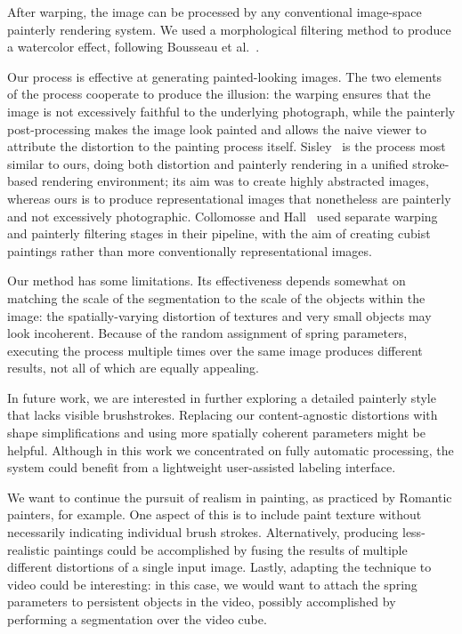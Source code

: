 After warping, the image can be processed by any conventional image-space
painterly rendering system. We used a morphological filtering method to
produce a watercolor effect, following Bousseau et al.~\cite{Bousseau:2007}.

Our process is effective at generating painted-looking images. The two elements
of the process cooperate to produce the illusion: the warping ensures that the
image is not excessively faithful to the underlying photograph, while the
painterly post-processing makes the image look painted and allows the naive
viewer to attribute the distortion to the painting process itself.
Sisley~\cite{sisley}
 is the process most similar to ours, doing both distortion
and painterly rendering in a unified stroke-based rendering environment; its aim
was to create highly abstracted images, whereas ours is to produce
representational images that nonetheless are painterly and not excessively
photographic. Collomosse and Hall~\cite{cubism} 
used separate warping and painterly filtering
stages in their pipeline, with the aim of creating cubist paintings rather than
more conventionally representational images.

Our method has some limitations. Its effectiveness depends somewhat on matching
the scale of the segmentation to the scale of the objects within the image: the
spatially-varying distortion of textures and very small objects may look
incoherent. Because of the random assignment of spring parameters, executing the
process multiple times over the same image produces different results, not all
of which are equally appealing.

In future work, we are interested in further exploring a detailed painterly
style that lacks visible brushstrokes. Replacing our content-agnostic
distortions with shape simplifications and using more spatially coherent
parameters might be helpful. Although in this work we concentrated on fully
automatic processing, the system could benefit from a lightweight user-assisted
labeling interface.

We want to continue the pursuit of realism in painting,
as practiced by Romantic painters, for example. One aspect of this is to include
paint texture without necessarily indicating individual brush strokes. Alternatively,
producing less-realistic paintings could be accomplished by fusing the results of multiple
different distortions of a single input image. Lastly,
adapting the technique to video could be interesting: in this case, we would
want to attach the spring parameters to persistent objects in the video,
possibly accomplished by performing a segmentation over the video cube.
